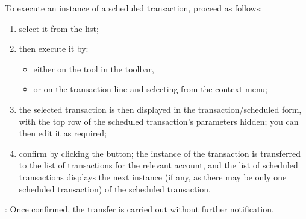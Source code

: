 To execute an instance of a scheduled transaction, proceed as follows:
\begin{enumerate}
	\item select it from the list;
	\item then execute it by:
	\begin{itemize}
		\item either  on the  tool in the toolbar,
		\item or  on the transaction line and selecting  from the context menu;
	\end{itemize}
	\item the selected transaction is then displayed in the transaction/scheduled form, with the top row of the scheduled transaction’s parameters hidden; you can then edit it as required;
	\item confirm by clicking the  button; the instance of the transaction is transferred to the list of transactions for the relevant account, and the list of scheduled transactions displays the next instance (if any, as there may be only one scheduled transaction) of the scheduled transaction.
\end{enumerate}

\Note{}: Once confirmed, the transfer is carried out without further notification.

